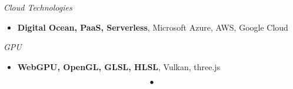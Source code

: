 \documentclass[10pt]{res} %
\begin{document}
\begin{resume}
	\vspace{4pt}
	{\sl Cloud Technologies}
	\begin{itemize}
		\item[] 	\textbf{Digital Ocean, PaaS, Serverless}, Microsoft Azure, AWS, Google Cloud
	\end{itemize}

	\vspace{4pt}
	{\sl GPU}
	\begin{itemize}
		\item[] 	\textbf{WebGPU, OpenGL, GLSL, HLSL}, Vulkan, three.js
	\end{itemize}

	$$\bullet$$

\end{resume}
\end{document}
